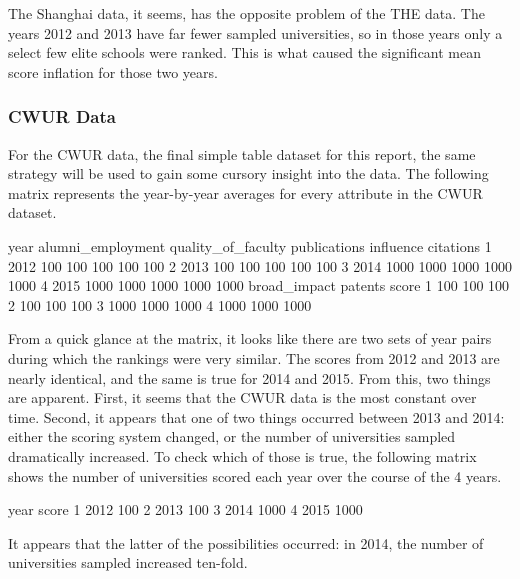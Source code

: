 \documentclass[12pt]{article}
\begin{document}
The Shanghai data, it seems, has the opposite problem of the THE data. The years 2012 and 2013 have far fewer sampled universities, so in those years only a select few elite schools were ranked. This is what caused the significant mean score inflation for those two years.


\subsubsection{CWUR Data}
For the CWUR data, the final simple table dataset for this report, the same strategy will be used to gain some cursory insight into the data. The following matrix represents the year-by-year averages for every attribute in the CWUR dataset.
\begin{Schunk}
\begin{Soutput}
  year alumni_employment quality_of_faculty publications influence citations
1 2012               100                100          100       100       100
2 2013               100                100          100       100       100
3 2014              1000               1000         1000      1000      1000
4 2015              1000               1000         1000      1000      1000
  broad_impact patents score
1          100     100   100
2          100     100   100
3         1000    1000  1000
4         1000    1000  1000
\end{Soutput}
\end{Schunk}

From a quick glance at the matrix, it looks like there are two sets of year pairs during which the rankings were very similar. The scores from 2012 and 2013 are nearly identical, and the same is true for 2014 and 2015. From this, two things are apparent. First, it seems that the CWUR data is the most constant over time. Second, it appears that one of two things occurred between 2013 and 2014: either the scoring system changed, or the number of universities sampled dramatically increased. To check which of those is true, the following matrix shows the number of universities scored each year over the course of the 4 years.

\begin{Schunk}
\begin{Soutput}
  year score
1 2012   100
2 2013   100
3 2014  1000
4 2015  1000
\end{Soutput}
\end{Schunk}

It appears that the latter of the possibilities occurred: in 2014, the number of universities sampled increased ten-fold.
\end{document}
